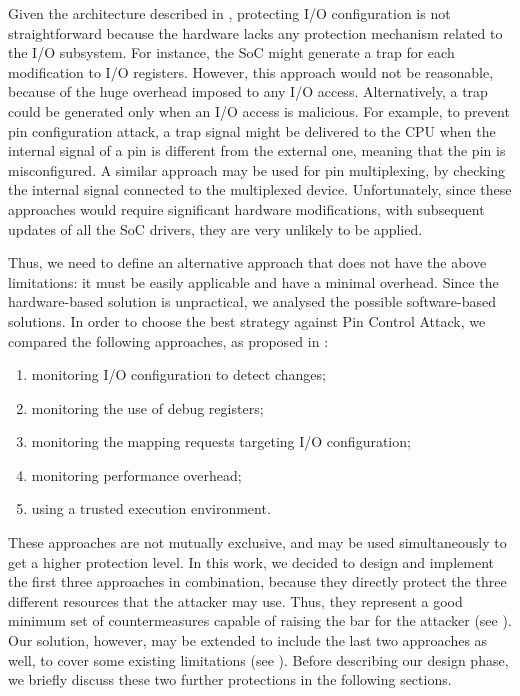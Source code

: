 Given the architecture described in , protecting I/O configuration is not straightforward because the hardware lacks
any protection mechanism related to the I/O subsystem. For instance, the SoC might generate a trap for each modification to I/O registers.
However, this approach would not be reasonable, because of the huge overhead imposed to any I/O access.
Alternatively, a trap could be generated only when an I/O access is malicious. For example, to prevent pin configuration attack,
a trap signal might be delivered to the CPU when the internal signal of a pin is different from the external one, meaning that the pin is misconfigured.
A similar approach may be used for pin multiplexing, by checking the internal signal connected to the multiplexed device.
Unfortunately, since these approaches would require significant hardware modifications, with subsequent updates of all the SoC drivers, they are very unlikely to be applied.

Thus, we need to define an alternative approach that does not have the above limitations: it must be easily applicable and have a minimal overhead.
Since the hardware-based solution is unpractical, we analysed the possible software-based solutions.
In order to choose the best strategy against Pin Control Attack, we compared the following approaches, as proposed in \cite{ghostplc}:
\begin{enumerate}
	\item monitoring I/O configuration to detect changes;
	\item monitoring the use of debug registers;
	\item monitoring the mapping requests targeting I/O configuration;
	\item monitoring performance overhead;
	\item using a trusted execution environment.
\end{enumerate}
These approaches are not mutually exclusive, and may be used simultaneously to get a higher protection level.
In this work, we decided to design and implement the first three approaches in combination, because they directly protect the three different resources that the attacker may use.
Thus, they represent a good minimum set of countermeasures capable of raising the bar for the attacker (see ).
Our solution, however, may be extended to include the last two approaches as well, to cover some existing limitations (see ).
Before describing our design phase, we briefly discuss these two further protections in the following sections.


